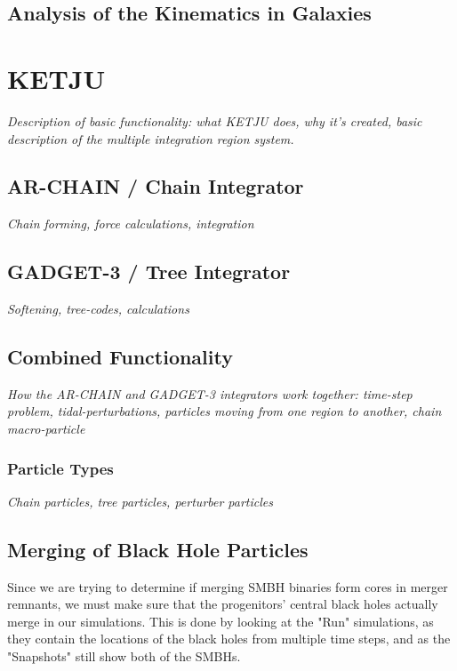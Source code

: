 \documentclass[english, oneside]{HYgradu}
\begin{document}
\section{Analysis of the Kinematics in Galaxies}

\chapter{KETJU}

\textit{Description of basic functionality: what KETJU does, why it's created, basic description of the multiple integration region system.} 

\section{AR-CHAIN / Chain Integrator}

\textit{Chain forming, force calculations, integration}

\section{GADGET-3 / Tree Integrator}

\textit{Softening, tree-codes, calculations}

\section{Combined Functionality}

\textit{How the AR-CHAIN and GADGET-3 integrators work together: time-step problem, tidal-perturbations, particles moving from one region to another, chain macro-particle}

\subsection{Particle Types}

\textit{Chain particles, tree particles, perturber particles}

\section{Merging of Black Hole Particles}

Since we are trying to determine if merging SMBH binaries form cores in merger remnants, we must make sure that the progenitors' central black holes actually merge in our simulations. This is done by looking at the "Run" simulations, as they contain the locations of the black holes from multiple time steps, and as the "Snapshots" still show both of the SMBHs.
\end{document}
